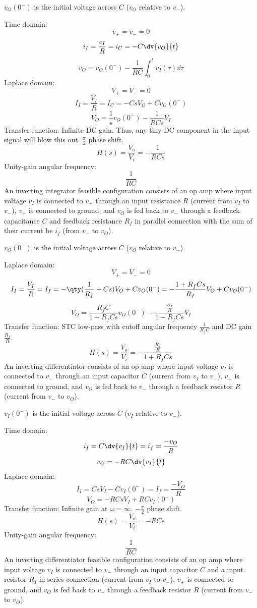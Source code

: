 \documentclass[a4paper,12pt]{report}
\begin{document}
$v_O(0^-)$ is the initial voltage across $C$ ($v_O$ relative to $v_-$).

Time domain:
\[v_+=v_-=0\]
\[i_I=\frac{v_I}{R}=i_C=-C\dv{v_O}{t}\]
\[v_O=v_O(0^-)-\frac{1}{RC}\int_0^tv_I(\tau)\dd{\tau}\]
Laplace domain:
\[V_+=V_-=0\]
\[I_I=\frac{V_I}{R}=I_C=-CsV_O+Cv_O(0^-)\]
\[V_O=\frac{1}{s}v_O(0^-)-\frac{1}{RCs}V_I\]
Transfer function: Infinite DC gain. Thus, any tiny DC component in the input signal will blow this out. $\frac{\pi}{2}$ phase shift.
\[H(s)=\frac{V_o}{V_i}=-\frac{1}{RCs}\]
Unity-gain angular frequency:
\[\frac{1}{RC}\]
An inverting integrator feasible configuration consists of an op amp where input voltage $v_I$ is connected to $v_-$ through an input resistance $R$ (current from $v_I$ to $v_-$), $v_+$ is connected to ground, and $v_O$ is fed back to $v_-$ through a feedback capacitance $C$ and feedback resistance $R_f$ in parallel connection with the sum of their current be $i_f$ (from $v_-$ to $v_O$).

$v_O(0^-)$ is the initial voltage across $C$ ($v_O$ relative to $v_-$).

Laplace domain:
\[V_+=V_-=0\]
\[I_I=\frac{V_I}{R}=I_f=-\qty(\frac{1}{R_f}+Cs)V_O+Cv_O(0^-)=-\frac{1+R_fCs}{R_f}V_O+Cv_O(0^-)\]
\[V_O=\frac{R_fC}{1+R_fCs}v_O(0^-)-\frac{\frac{R_f}{R}}{1+R_fCs}V_I\]
Transfer function: STC low-pass with cutoff angular frequency $\frac{1}{R_fC}$ and DC gain $\frac{R_f}{R}$.
\[H(s)=\frac{V_o}{V_i}=-\frac{\frac{R_f}{R}}{1+R_fCs}\]
An inverting differentiator consists of an op amp where input voltage $v_I$ is connected to $v_-$ through an input capacitor $C$ (current from $v_I$ to $v_-$), $v_+$ is connected to ground, and $v_O$ is fed back to $v_-$ through a feedback resistor $R$ (current from $v_-$ to $v_O$).

$v_I(0^-)$ is the initial voltage across $C$ ($v_I$ relative to $v_-$).

Time domain:
\[i_I=C\dv{v_I}{t}=i_f=\frac{-v_O}{R}\]
\[v_O=-RC\dv{v_I}{t}\]
Laplace domain:
\[I_I=CsV_I-Cv_I(0^-)=I_f=\frac{-V_O}{R}\]
\[V_O=-RCsV_I+RCv_I(0^-)\]
Transfer function: Infinite gain at $\omega=\infty$. $-\frac{\pi}{2}$ phase shift.
\[H(s)=\frac{V_o}{V_i}=-RCs\]
Unity-gain angular frequency:
\[\frac{1}{RC}\]
An inverting differentiator feasible configuration consists of an op amp where input voltage $v_I$ is connected to $v_-$ through an input capacitor $C$ and a input resistor $R_I$ in series connection (current from $v_I$ to $v_-$), $v_+$ is connected to ground, and $v_O$ is fed back to $v_-$ through a feedback resistor $R$ (current from $v_-$ to $v_O$).
\end{document}
